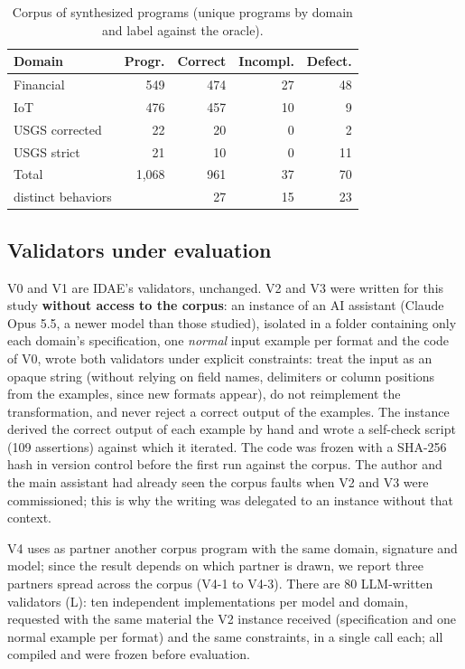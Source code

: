 \documentclass[sigconf,nonacm]{acmart}
\begin{document}
\begin{table}[t]
\caption{Corpus of synthesized programs (unique programs by domain and label against the oracle).}
\label{tab:corpus}
\small
\begin{tabular}{lrrrr}
\toprule
Domain & Progr. & Correct & Incompl. & Defect. \\
\midrule
Financial & 549 & 474 & 27 & 48 \\
IoT & 476 & 457 & 10 & 9 \\
USGS corrected & 22 & 20 & 0 & 2 \\
USGS strict & 21 & 10 & 0 & 11 \\
\midrule
Total & 1{,}068 & 961 & 37 & 70 \\
\quad distinct behaviors & & 27 & 15 & 23 \\
\bottomrule
\end{tabular}
\end{table}

\subsection{Validators under evaluation}

V0 and V1 are IDAE's validators, unchanged. V2 and V3 were written for this study \textbf{without access to the corpus}: an instance of an AI assistant (Claude Opus 5.5, a newer model than those studied), isolated in a folder containing only each domain's specification, one \textit{normal} input example per format and the code of V0, wrote both validators under explicit constraints: treat the input as an opaque string (without relying on field names, delimiters or column positions from the examples, since new formats appear), do not reimplement the transformation, and never reject a correct output of the examples. The instance derived the correct output of each example by hand and wrote a self-check script (109 assertions) against which it iterated. The code was frozen with a SHA-256 hash in version control before the first run against the corpus. The author and the main assistant had already seen the corpus faults when V2 and V3 were commissioned; this is why the writing was delegated to an instance without that context.

V4 uses as partner another corpus program with the same domain, signature and model; since the result depends on which partner is drawn, we report three partners spread across the corpus (V4-1 to V4-3). There are 80 LLM-written validators (L): ten independent implementations per model and domain, requested with the same material the V2 instance received (specification and one normal example per format) and the same constraints, in a single call each; all compiled and were frozen before evaluation.
\end{document}
